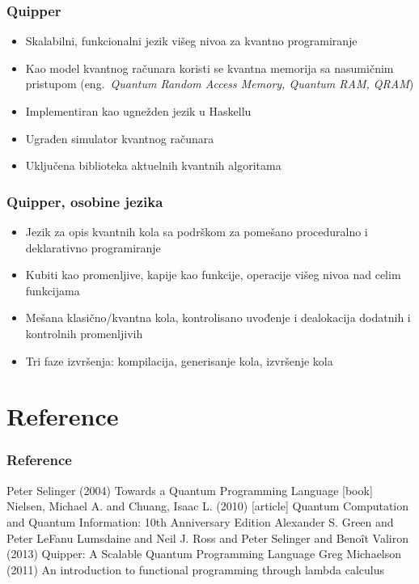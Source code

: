 \documentclass[12pt,hyperref={unicode}]{beamer}
\begin{document}
\begin{frame}
\frametitle{Quipper}
\begin{itemize}
\item{Skalabilni, funkcionalni jezik višeg nivoa za kvantno programiranje \cite{p3}}
\item{Kao model kvantnog računara koristi se kvantna memorija sa nasumičnim pristupom (eng.~\emph{Quantum Random Access Memory, Quantum RAM, QRAM}})
\item{Implementiran kao ugnežden jezik u Haskellu}
\item{Ugrađen simulator kvantnog računara}
\item{Uključena biblioteka aktuelnih kvantnih algoritama}
\end{itemize}
\end{frame}
\begin{frame}
\frametitle{Quipper, osobine jezika}
\begin{itemize}
\item{Jezik za opis kvantnih kola sa podrškom za pomešano proceduralno i deklarativno programiranje}
\item{Kubiti kao promenljive, kapije kao funkcije, operacije višeg nivoa nad celim funkcijama}
\item{Mešana klasično/kvantna kola, kontrolisano uvođenje i dealokacija dodatnih i kontrolnih promenljivih}
\item{Tri faze izvršenja: kompilacija, generisanje kola, izvršenje kola}
\end{itemize}
\end{frame}

\section{Reference}

\begin{frame}
\frametitle{Reference}
\footnotesize{
\begin{thebibliography}{99} %
 Peter Selinger (2004)
\newblock Towards a Quantum Programming Language
[book]
 Nielsen, Michael A. and Chuang, Isaac L. (2010)
[article]
\newblock Quantum Computation and Quantum Information: 10th Anniversary Edition
 Alexander S. Green and Peter LeFanu Lumsdaine and Neil J. Ross and Peter Selinger and Benoît Valiron (2013)
\newblock Quipper: A Scalable Quantum Programming Language
 Greg Michaelson (2011)
\newblock An introduction to functional programming through lambda calculus
\end{thebibliography}
}
\end{frame}

\end{document}
